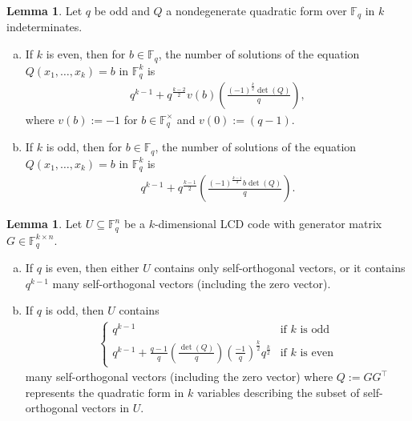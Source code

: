 \documentclass[11pt]{article}
\theoremstyle{definition}
\newtheorem{lemma}[theorem]{Lemma}
\newcommand{\F}{\mathbb{F}}
\newcommand{\Leg}[2]{\left(\frac{#1}{#2}\right)}                       %
\begin{document}
\begin{lemma}\cite[Theorems 6.26 and 6.27]{LN08}\label{lem:solutions-quadratic-form}
	Let $q$ be odd and $Q$ a nondegenerate quadratic form over $\F_q$ in $k$ indeterminates.
	\begin{enumerate}[(a)]
		\item If $k$ is even, then for $b \in \F_q$, the number of solutions  of the equation $Q(x_1, \ldots, x_k) = b$ in $\F_q^k$ is 
			\begin{align*}
				q^{k - 1} + q^{\frac{k - 2}{2}} v(b) \Leg{{(-1)}^{\frac{k}{2}} \det(Q)}{q},
			\end{align*}
			where $v(b) := -1$ for $b \in \F_q^\times$ and $v(0) := (q - 1)$.
		\item If $k$ is odd, then for $b \in \F_q$, the number of solutions  of the equation $Q(x_1, \ldots, x_k) = b$ in $\F_q^k$ is 
			\begin{align*}
				q^{k - 1} + q^{\frac{k - 1}{2}} \Leg{{(-1)}^{\frac{k - 1}{2}} b \det(Q)}{q}.
			\end{align*}
	\end{enumerate}
\end{lemma}

\begin{lemma}\label{lem:self-orthogonal}
	Let $U\subseteq \F_q^n$ be a $k$-dimensional LCD code with generator matrix $G\in \F_q^{k\times n}$.
	\begin{enumerate}[(a)]
		\item If $q$ is even, then either $U$ contains only self-orthogonal vectors, or it contains $q^{k-1}$ many self-orthogonal vectors (including the zero vector).
		\item If $q$ is odd, then $U$ contains 
			\begin{align*}
				\begin{cases}
					q^{k - 1}
					& \text{if $k$ is odd} \\
					q^{k - 1} + \frac{q - 1}{q} \Leg{\det(Q)}{q} {\Leg{-1}{q} }^{\frac{k}{2}} q^{\frac{k}{2}}
					& \text{if $k$ is even}
				\end{cases}
			\end{align*}
			many self-orthogonal vectors (including the zero vector) where $Q := G G^\top$ represents the quadratic form in $k$ variables describing the subset of self-orthogonal vectors in $U$.
	\end{enumerate}
\end{lemma}
\end{document}
